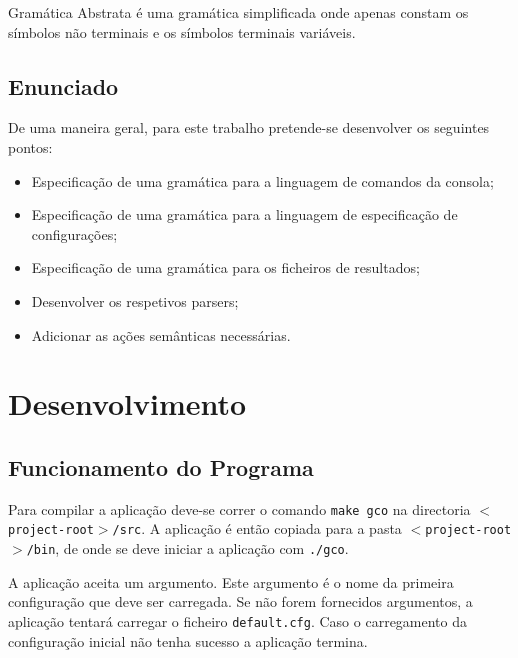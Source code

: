 \documentclass[11pt, a4paper, oneside]{article}
\begin{document}
Gramática Abstrata é uma gramática simplificada onde apenas constam os símbolos não terminais e os símbolos terminais variáveis.

\subsection{Enunciado}

De uma maneira geral, para este trabalho pretende-se desenvolver os seguintes pontos:

\begin{itemize}
\item Especificação de uma gramática para a linguagem de comandos da consola;
\item Especificação de uma gramática para a linguagem de especificação de configurações;
\item Especificação de uma gramática para os ficheiros de resultados;
\item Desenvolver os respetivos parsers;
\item Adicionar as ações semânticas necessárias.
\end{itemize}

\newpage
\section{Desenvolvimento}

\subsection{Funcionamento do Programa}

Para compilar a aplicação deve-se correr o comando \texttt{make gco} na directoria \texttt{$<$project-root$>$/src}. A aplicação é então copiada para a pasta \texttt{$<$project-root$>$/bin}, de onde se deve iniciar a aplicação com \texttt{./gco}.

A aplicação aceita um argumento. Este argumento é o nome da primeira configuração que deve ser carregada. Se não forem fornecidos argumentos, a aplicação tentará carregar o ficheiro \texttt{default.cfg}. Caso o carregamento da configuração inicial não tenha sucesso a aplicação termina.
\end{document}

